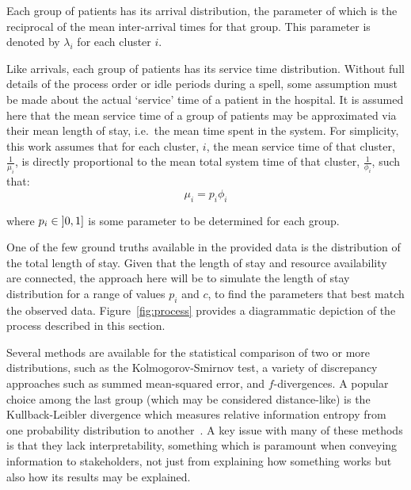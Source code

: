 \documentclass[11pt]{article}
\begin{document}
Each group of patients has its arrival distribution, the parameter of which is
the reciprocal of the mean inter-arrival times for that group. This parameter
is denoted by \(\lambda_i\) for each cluster \(i\).

Like arrivals, each group of patients has its service time distribution.
Without full details of the process order or idle periods during a spell, some
assumption must be made about the actual `service' time of a patient in the
hospital. It is assumed here that the mean service time of a group of patients
may be approximated via their mean length of stay, i.e.\ the mean time spent in
the system. For simplicity, this work assumes that for each cluster, \(i\), the
mean service time of that cluster, \(\frac{1}{\mu_i}\), is directly proportional
to the mean total system time of that cluster, \(\frac{1}{\phi_i}\), such that:
\begin{equation}\label{eq:services}
    \mu_i = p_i \phi_i
\end{equation}

\noindent where \(p_i \in \interval[open left]{0}{1}\) is some parameter to be
determined for each group.

One of the few ground truths available in the provided data is the distribution
of the total length of stay. Given that the length of stay and resource
availability are connected, the approach here will be to simulate the length of
stay distribution for a range of values \(p_i\) and \(c\), to find the
parameters that best match the observed data. Figure~\ref{fig:process} provides
a diagrammatic depiction of the process described in this section.

Several methods are available for the statistical comparison of two or more
distributions, such as the Kolmogorov-Smirnov test, a variety of discrepancy
approaches such as summed mean-squared error, and \(f\)-divergences. A popular
choice among the last group (which may be considered distance-like) is the
Kullback-Leibler divergence which measures relative information entropy from one
probability distribution to another~\cite{Kullback1951}. A key issue with many
of these methods is that they lack interpretability, something which is
paramount when conveying information to stakeholders, not just from explaining
how something works but also how its results may be explained.
\end{document}
